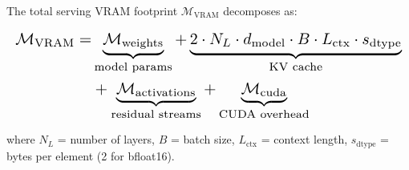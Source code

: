 \documentclass[10pt,journal,compsoc,twocolumn]{IEEEtran}
\begin{document}
The total serving VRAM footprint $\mathcal{M}_{\text{VRAM}}$ decomposes as:



























\begin{equation}
\resizebox{\columnwidth}{!}{$\displaystyle
\begin{aligned}
\mathcal{M}_{\text{VRAM}} = & \underbrace{\mathcal{M}_{\text{weights}}}_{\text{model params}} + \underbrace{2 \cdot N_L \cdot d_{\text{model}} \cdot B \cdot L_{\text{ctx}} \cdot s_{\text{dtype}}}_{\text{KV cache}} \\
& + \underbrace{\mathcal{M}_{\text{activations}}}_{\text{residual streams}} + \underbrace{\mathcal{M}_{\text{cuda}}}_{\text{CUDA overhead}}
\end{aligned}
$}
\end{equation}



























where $N_L$ = number of layers, $B$ = batch size, $L_{\text{ctx}}$ = context length, $s_{\text{dtype}}$ = bytes per element (2 for bfloat16).

\begin{table}[htbp]
\centering
\caption{KV Cache Memory at Various Context Lengths ($N_L = 80$, $d_{\text{model}} = 8192$, $B = 1$, bfloat16)}
\end{table}
\end{document}
